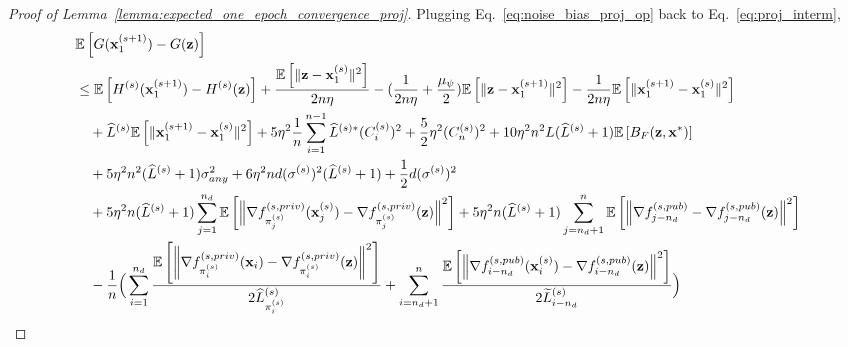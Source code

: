 \begin{proof}[Proof of Lemma~\ref{lemma:expected_one_epoch_convergence_proj}]
Plugging Eq.~\ref{eq:noise_bias_proj_op} back to Eq.~\ref{eq:proj_interm},
\begin{align}
    &\mathbb{E}\left[G({\mathbf{x}}_1^{(s+1)}) - G({\mathbf{z}})\right]\\
    \nonumber
    &\leq \mathbb{E}\left[ H^{(s)}({\mathbf{x}}_1^{(s+1)}) - H^{(s)}({\mathbf{z}})\right]
        + \frac{\mathbb{E}\left[\|{\mathbf{z}} - {\mathbf{x}}_1^{(s)}\|^2 \right]}{2n \eta}
    - (\frac{1}{2n \eta} + \frac{\mu_\psi}{2}) \mathbb{E}\left[\|{\mathbf{z}} - {\mathbf{x}}_1^{(s+1)}\|^2\right]
        - \frac{1}{2n \eta}\mathbb{E}\left[\|{\mathbf{x}}_1^{(s+1)} - {\mathbf{x}}_1^{(s)}\|^2 \right]\\
    \nonumber
    &\quad
    + \widehat{L}^{(s)}\mathbb{E}\left[\| {\mathbf{x}}_1^{(s+1)} - {\mathbf{x}}_1^{(s)}\|^2\right]
    + 5\eta^2 \frac{1}{n}\sum_{i=1}^{n-1} \widehat{L}^{(s)*} (C_i^{(s)})^2
    + \frac{5}{2}\eta^2 (C_n^{(s)})^2
    + 10 \eta^2 n^2 L (\widehat{L}^{(s)}+1) \mathbb{E}\left[B_F({\mathbf{z}}, {\mathbf{x}}^*)\right]\\
    \nonumber
    &\quad + 5\eta^2 n^2 (\widehat{L}^{(s)} +1) \sigma_{any}^2 + 6 \eta^2 nd (\sigma^{(s)})^2 (\widehat{L}^{(s)}+1)
    + \frac{1}{2}d (\sigma^{(s)})^2 \\
    \nonumber
    &\quad + 5\eta^2 n (\widehat{L}^{(s)} +1 ) \sum_{j=1}^{n_d} \mathbb{E}\left[\Big\| \nabla f_{\pi_j^{(s)}}^{(s, priv)}({\mathbf{x}}_{j}^{(s)}) - \nabla f_{\pi_j^{(s)}}^{(s, priv)}({\mathbf{z}})\Big\|^2\right]
        + 5\eta^2 n (\widehat{L}^{(s)} + 1 )\sum_{j=n_d+1}^{n} \mathbb{E}\left[\Big\| \nabla f_{j-n_d}^{(s, pub)} - \nabla f_{j-n_d}^{(s,pub)}({\mathbf{z}})\Big\|^2\right]\\
    \nonumber
        &\quad - \frac{1}{n} \Big( 
        \sum_{i=1}^{n_d} \frac{ \mathbb{E}\left[\left\|\nabla f_{\pi_i^{(s)}}^{(s, priv)}({\mathbf{x}}_i) - \nabla f_{\pi_i^{(s)}}^{(s, priv)}({\mathbf{z}}) \right\|^2 \right]}{2 \widehat{L}_{\pi_i^{(s)}}^{(s)}}
        + \sum_{i=n_d+1}^{n} \frac{ \mathbb{E}\left[\left\| \nabla f_{i-n_d}^{(s, pub)}({\mathbf{x}}_i^{(s)}) - \nabla f_{i-n_d}^{(s, pub)}({\mathbf{z}}) \right\|^2 \right]}{2\widetilde{L}_{i-n_d}^{(s)}}
        \Big) 
\end{align}


\end{proof}

